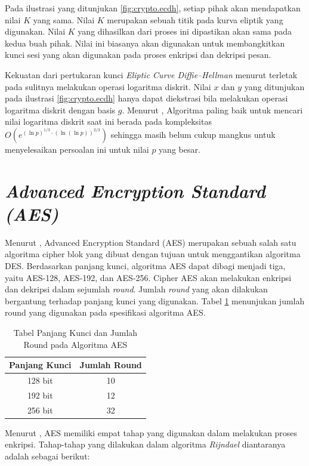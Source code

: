 Pada ilustrasi yang ditunjukan \ref{fig:crypto.ecdh}, setiap pihak akan mendapatkan nilai $K$ yang sama. Nilai $K$ merupakan sebuah titik pada kurva eliptik yang digunakan. Nilai $K$ yang dihasilkan dari proses ini dipastikan akan sama pada kedua buah pihak. Nilai ini biasanya akan digunakan untuk membangkitkan kunci sesi yang akan digunakan pada proses enkripsi dan dekripsi pesan.

Kekuatan dari pertukaran kunci \emph{Eliptic Curve Diffie–Hellman} menurut \textcite{munir2019} terletak pada sulitnya melakukan operasi logaritma diskrit. Nilai $x$ dan $y$ yang ditunjukan pada ilustrasi \ref{fig:crypto.ecdh} hanya dapat diekstrasi bila melakukan operasi logaritma diskrit dengan basis $g$. Menurut \textcite{staling2011}, Algoritma paling baik untuk mencari nilai logaritma diskrit saat ini berada pada kompleksitas $O(e^{(\ln{p})^{1/3} \cdot (\ln{(\ln{p})})^{2/3}})$ sehingga masih belum cukup mangkus untuk menyelesaikan persoalan ini untuk nilai $p$ yang besar.

\section{\emph{Advanced Encryption Standard (AES)}}
Menurut \textcite{staling2011}, Advanced Encryption Standard (AES) merupakan sebuah salah satu algoritma cipher blok yang dibuat dengan tujuan untuk menggantikan algoritma DES. Berdasarkan panjang kunci, algoritma AES dapat dibagi menjadi tiga, yaitu AES-128, AES-192, dan AES-256. Cipher AES akan melakukan enkripsi dan dekripsi dalam sejumlah \emph{round}. Jumlah \emph{round} yang akan dilakukan bergantung terhadap panjang kunci yang digunakan. Tabel \ref{tab:aes-round} menunjukan jumlah round yang digunakan pada spesifikasi algoritma AES.

\begin{longtable}{|c|c|}
  \caption{\label{tab:aes-round} Tabel Panjang Kunci dan Jumlah Round pada Algoritma AES} \\
  \hline
  \textbf{Panjang Kunci} & \textbf{Jumlah Round} \\ \hline
  128 bit       & 10           \\ \hline
  192 bit       & 12           \\ \hline
  256 bit       & 32           \\ \hline
\end{longtable}

Menurut \textcite{staling2011}, AES memiliki empat tahap yang digunakan dalam melakukan proses enkripsi. Tahap-tahap yang dilakukan dalam algoritma \emph{Rijndael} diantaranya adalah sebagai berikut:

